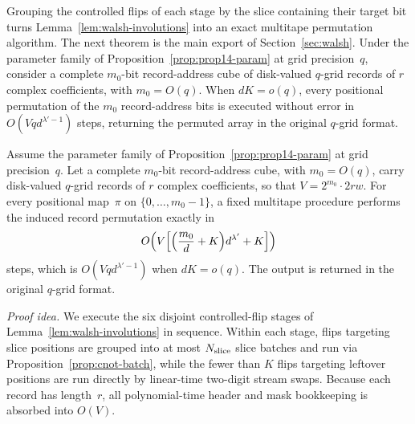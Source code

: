 Grouping the controlled flips of each stage by the slice containing their target bit turns
Lemma~\ref{lem:walsh-involutions} into an exact multitape permutation algorithm. The next theorem is the main export of
Section~\ref{sec:walsh}. Under the parameter family of Proposition~\ref{prop:prop14-param} at grid precision~$q$,
consider a complete $m_0$-bit record-address cube of disk-valued $q$-grid records of $r$ complex coefficients, with
$m_0=O(q)$. When $dK=o(q)$, every positional permutation of the $m_0$ record-address bits is executed without error in
$O(Vqd^{\lambda'-1})$ steps, returning the permuted array in the original $q$-grid format.

\begin{theorem}\label{thm:positional-perm}
Assume the parameter family of Proposition~\ref{prop:prop14-param} at grid precision~$q$. Let a complete $m_0$-bit
record-address cube, with $m_0=O(q)$, carry disk-valued $q$-grid records of $r$ complex coefficients, so that
$V=2^{m_0}\cdot2rw$. For every positional map~$\pi$ on $\{0,\dots,m_0-1\}$, a fixed multitape procedure performs the
induced record permutation exactly in
\begin{equation}\label{eq:walsh-perm-cost}
  O\Bigl(V\Bigl[\Bigl(\frac{m_0}{d}+K\Bigr)d^{\lambda'}+K\Bigr]\Bigr)
\end{equation}
steps, which is $O(Vqd^{\lambda'-1})$ when $dK=o(q)$. The output is returned in the original $q$-grid format.
\end{theorem}

\emph{Proof idea.} We execute the six disjoint controlled-flip stages of Lemma~\ref{lem:walsh-involutions} in sequence.
Within each stage, flips targeting slice positions are grouped into at most $N_{\rm slice}$ slice batches and run via
Proposition~\ref{prop:cnot-batch}, while the fewer than $K$ flips targeting leftover positions are run directly by
linear-time two-digit stream swaps. Because each record has length~$r$, all polynomial-time header and mask bookkeeping
is absorbed into $O(V)$.

